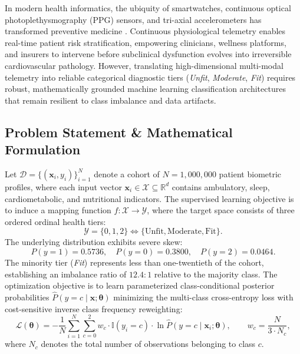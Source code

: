 \documentclass[11pt,a4paper]{article}
\begin{document}
In modern health informatics, the ubiquity of smartwatches, continuous optical photoplethysmography (PPG) sensors, and tri-axial accelerometers has transformed preventive medicine \citep{dunn2021,smuck2021}. Continuous physiological telemetry enables real-time patient risk stratification, empowering clinicians, wellness platforms, and insurers to intervene before subclinical dysfunction evolves into irreversible cardiovascular pathology. However, translating high-dimensional multi-modal telemetry into reliable categorical diagnostic tiers (\emph{Unfit}, \emph{Moderate}, \emph{Fit}) requires robust, mathematically grounded machine learning classification architectures that remain resilient to class imbalance and data artifacts.

\subsection{Problem Statement \& Mathematical Formulation}
Let $\mathcal{D} = \{(\mathbf{x}_i, y_i)\}_{i=1}^N$ denote a cohort of $N = 1{,}000{,}000$ patient biometric profiles, where each input vector $\mathbf{x}_i \in \mathcal{X} \subseteq \mathbb{R}^d$ contains ambulatory, sleep, cardiometabolic, and nutritional indicators. The supervised learning objective is to induce a mapping function $f: \mathcal{X} \to \mathcal{Y}$, where the target space consists of three ordered ordinal health tiers:
\begin{equation}
\mathcal{Y} = \{0, 1, 2\} \iff \{\text{Unfit}, \text{Moderate}, \text{Fit}\}.
\end{equation}
The underlying distribution exhibits severe skew:
\begin{equation}
P(y = 1) = 0.5736, \quad P(y = 0) = 0.3800, \quad P(y = 2) = 0.0464.
\end{equation}
The minority tier (\emph{Fit}) represents less than one-twentieth of the cohort, establishing an imbalance ratio of $12.4 : 1$ relative to the majority class. The optimization objective is to learn parameterized class-conditional posterior probabilities $\hat{P}(y = c \mid \mathbf{x}; \boldsymbol{\theta})$ minimizing the multi-class cross-entropy loss with cost-sensitive inverse class frequency reweighting:
\begin{equation}
\mathcal{L}(\boldsymbol{\theta}) = -\frac{1}{N} \sum_{i=1}^N \sum_{c=0}^2 w_c \cdot \mathbb{I}(y_i = c) \cdot \ln \hat{P}(y = c \mid \mathbf{x}_i; \boldsymbol{\theta}), \qquad w_c = \frac{N}{3 \cdot N_c},
\end{equation}
where $N_c$ denotes the total number of observations belonging to class $c$.
\end{document}
